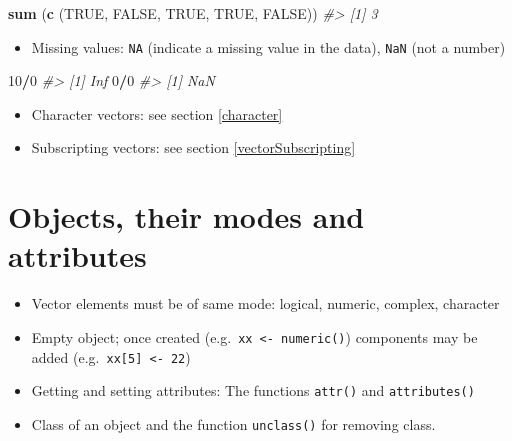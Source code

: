 \documentclass[
]{book}
\newenvironment{Shaded}{\begin{snugshade}}{\end{snugshade}}
\newcommand{\CommentTok}[1]{\textcolor[rgb]{0.56,0.35,0.01}{\textit{#1}}}
\newcommand{\ConstantTok}[1]{\textcolor[rgb]{0.56,0.35,0.01}{#1}}
\newcommand{\DecValTok}[1]{\textcolor[rgb]{0.00,0.00,0.81}{#1}}
\newcommand{\FunctionTok}[1]{\textcolor[rgb]{0.13,0.29,0.53}{\textbf{#1}}}
\newcommand{\NormalTok}[1]{#1}
\newcommand{\SpecialCharTok}[1]{\textcolor[rgb]{0.81,0.36,0.00}{\textbf{#1}}}
\providecommand{\tightlist}{%
  \setlength{\itemsep}{0pt}\setlength{\parskip}{0pt}}
\begin{document}
\begin{Shaded}
\begin{Highlighting}[]
\FunctionTok{sum}\NormalTok{ (}\FunctionTok{c}\NormalTok{ (}\ConstantTok{TRUE}\NormalTok{, }\ConstantTok{FALSE}\NormalTok{, }\ConstantTok{TRUE}\NormalTok{, }\ConstantTok{TRUE}\NormalTok{, }\ConstantTok{FALSE}\NormalTok{))}
\CommentTok{\#\textgreater{} [1] 3}
\end{Highlighting}
\end{Shaded}

\begin{itemize}
\tightlist
\item
  Missing values: \texttt{NA} (indicate a missing value in the data), \texttt{NaN} (not a number)
\end{itemize}

\begin{Shaded}
\begin{Highlighting}[]
\DecValTok{10}\SpecialCharTok{/}\DecValTok{0}
\CommentTok{\#\textgreater{} [1] Inf}
\DecValTok{0}\SpecialCharTok{/}\DecValTok{0}
\CommentTok{\#\textgreater{} [1] NaN}
\end{Highlighting}
\end{Shaded}

\begin{itemize}
\item
  Character vectors: see section \ref{character}
\item
  Subscripting vectors: see section \ref{vectorSubscripting}
\end{itemize}

\section{Objects, their modes and attributes}\label{objects-their-modes-and-attributes}

\begin{itemize}
\tightlist
\item
  Vector elements must be of same mode: logical, numeric, complex, character
\item
  Empty object; once created (e.g.~\texttt{xx\ \textless{}-\ numeric()}) components may be added (e.g.~\texttt{xx{[}5{]}\ \textless{}-\ 22})
\item
  Getting and setting attributes: The functions \texttt{attr()} and \texttt{attributes()}
\item
  Class of an object and the function \texttt{unclass()} for removing class.
\end{itemize}
\end{document}
